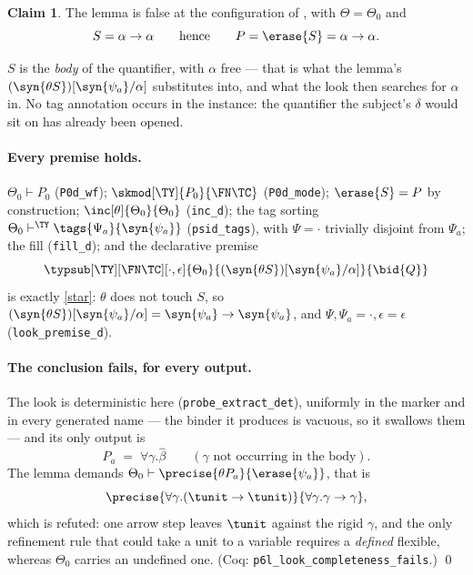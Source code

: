 \documentclass[11pt,a4paper]{article}
\theoremstyle{definition}
\newtheorem{claimc}{Claim}
\newcommand{\coq}[1]{\texttt{\small #1}}
\begin{document}
\begin{claimc}\label{cl:look}
  The lemma is false at the configuration of , with
  $\Theta = \Theta_0$ and
  \[
    S = \alpha\to\alpha
    \qquad\text{hence}\qquad
    P = \erase{S} = \alpha\to\alpha .
  \]
\end{claimc}

\noindent
$S$ is the \emph{body} of the quantifier, with $\alpha$ free --- that is
what the lemma's $(\syn{\theta S})[\syn{\psi_a}/\alpha]$ substitutes
into, and what the look then searches for $\alpha$ in.  No tag annotation
occurs in the instance: the quantifier the subject's $\delta$ would sit on
has already been opened.

\paragraph{Every premise holds.}
$\Theta_0\vdash P_0$ (\coq{P0d\_wf}); $\skmod[\TY]{P_0}{\FN\TC}$
(\coq{P0d\_mode}); $\erase{S}=P$ by construction;
$\inc[\theta]{\Theta_0}{\Theta_0}$ (\coq{inc\_d}); the tag sorting
$\Theta_0\vdash^{\TY}\tags{\Psi_a}{\syn{\psi_a}}$ (\coq{psid\_tags}), with
$\Psi = \cdot$ trivially disjoint from $\Psi_a$; the fill
(\coq{fill\_d}); and the declarative premise
\[
  \typsub[\TY][\FN\TC][\cdot,\epsilon]{\Theta_0}{
    (\syn{\theta S})[\syn{\psi_a}/\alpha]}{\bid{Q}}
\]
is exactly \eqref{star}: $\theta$ does not touch $S$, so
$(\syn{\theta S})[\syn{\psi_a}/\alpha] =
 \syn{\psi_a}\to\syn{\psi_a}$, and $\Psi,\Psi_a = \cdot,\epsilon =
 \epsilon$ (\coq{look\_premise\_d}).

\paragraph{The conclusion fails, for every output.}
The look is deterministic here (\coq{probe\_extract\_det}), uniformly in
the marker and in every generated name --- the binder it produces is
vacuous, so it swallows them --- and its only output is
\[
  P_a \;=\; \forall\gamma.\hat\beta
  \qquad(\gamma\text{ not occurring in the body}).
\]
The lemma demands $\Theta_0\vdash\precise{\theta P_a}{\erase{\psi_a}}$,
that is
\[
  \precise{\forall\gamma.(\tunit\to\tunit)}
          {\forall\gamma.\gamma\to\gamma},
\]
which is refuted: one arrow step leaves $\tunit$ against the rigid
$\gamma$, and the only refinement rule that could take a unit to a
variable requires a \emph{defined} flexible, whereas $\Theta_0$ carries an
undefined one.  (Coq: \coq{p6l\_look\_completeness\_fails}.)
\qed
\end{document}
